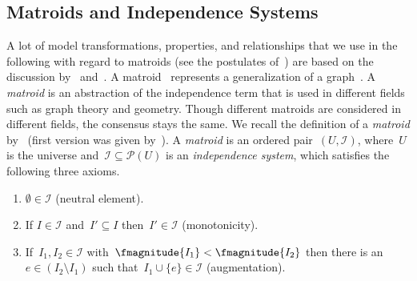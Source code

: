 \subsection{Matroids and Independence Systems}
\label{ch:network-analyzes:sec:mathematical-model:subsec:matroids-independence-systems}
% 
% 
% 
A lot of model transformations, properties, and relationships that we use in the
following with regard to matroids (see the postulates of~\textcite[p.510;
Theorem 1]{Whi35}) are based on the discussion by~\textcite{Ses61}
and~\textcite{Whi35,Whi31}. A matroid~\parencite{Whi35} represents a
generalization of a graph~\parencite{Whi31}.
% 
A \emph{matroid} is an abstraction of the independence term that is used in
different fields such as graph theory and geometry. Though different matroids
are considered in different fields, the consensus stays the same. We recall the
definition of a \emph{matroid} by~\textcite[pp.279]{Kor00} (first version was
given by~\textcite[p.510]{Whi35}). A \emph{matroid} is an ordered
pair~$(U,\mathcal{I})$, where~$U$ is the universe
and~$\mathcal{I}\subseteq\mathcal{P}(U)$ is an \emph{independence system}, which
satisfies the following three axioms.
% 
\begin{enumerate}%
    \item $\emptyset\in\mathcal{I}$ (neutral element).
    \label{ch:network-analyzes:sec:mathematical-model:matroid:1}
    \item If $I\in\mathcal{I}$ and~$I'\subseteq I$ then~$I'\in\mathcal{I}$ 
    (monotonicity).%
    \label{ch:network-analyzes:sec:mathematical-model:matroid:2}
    \item If~$I_1, I_2\in\mathcal{I}$ with~$\fmagnitude{I_1} < \fmagnitude{I_2}$
    then there is an~$e\in (I_2\setminus I_1)$ such
    that~$I_1\cup\{e\}\in\mathcal{I}$ (augmentation).%
    \label{ch:network-analyzes:sec:mathematical-model:matroid:3}
\end{enumerate}
